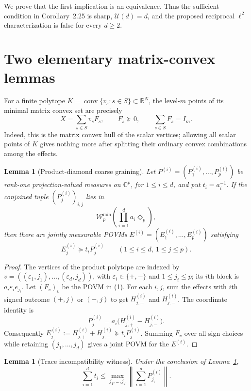 \documentclass[11pt]{article}
\newtheorem{lemma}[theorem]{Lemma}
\newcommand{\W}{\mathcal W}
\newcommand{\C}{\mathbb C}
\newcommand{\conv}{\operatorname{conv}}
\begin{document}
We prove that the first implication is an equivalence.  Thus the sufficient
condition in Corollary~2.25 is sharp, $\mathcal U(d)=d$, and the proposed
reciprocal $\ell^2$ characterization is false for every $d\geq2$.

\section{Two elementary matrix-convex lemmas}

For a finite polytope $K=\conv\{v_s:s\in S\}\subset\mathbb R^N$, the
level-$m$ points of its minimal matrix convex set are precisely
\begin{equation}
 X=\sum_{s\in S}v_sF_s,
 \qquad F_s\succeq0,\qquad \sum_{s\in S}F_s=I_m.
\end{equation}
Indeed, this is the matrix convex hull of the scalar vertices; allowing all
scalar points of $K$ gives nothing more after splitting their ordinary convex
combinations among the effects.

\begin{lemma}[Product-diamond coarse graining]\label{lem:coarse}
Let $P^{(i)}=(P^{(i)}_1,\ldots,P^{(i)}_p)$ be rank-one projection-valued
measures on $\C^p$, for $1\leq i\leq d$, and put $t_i=a_i^{-1}$.  If the
conjoined tuple $(P^{(i)}_j)_{i,j}$ lies in
\[
 \W^{\min}_p\!\left(\prod_{i=1}^d a_i\Diamond_p\right),
\]
then there are jointly measurable POVMs
$E^{(i)}=(E^{(i)}_1,\ldots,E^{(i)}_p)$ satisfying
\begin{equation}
 E^{(i)}_j\succeq t_iP^{(i)}_j\qquad(1\leq i\leq d,\ 1\leq j\leq p).
\end{equation}
\end{lemma}

\begin{proof}
The vertices of the product polytope are indexed by
$v=((\varepsilon_1,j_1),\ldots,(\varepsilon_d,j_d))$, with
$\varepsilon_i\in\{+,-\}$ and $1\leq j_i\leq p$; its $i$th block is
$a_i\varepsilon_i e_{j_i}$.  Let $(F_v)_v$ be the POVM in (1).  For each
$i,j$, sum the effects with $i$th signed outcome $(+,j)$ or $(-,j)$ to get
$H^{(i)}_{j,+}$ and $H^{(i)}_{j,-}$.  The coordinate identity is
\[
 P^{(i)}_j=a_i\bigl(H^{(i)}_{j,+}-H^{(i)}_{j,-}\bigr).
\]
Consequently
$E^{(i)}_j:=H^{(i)}_{j,+}+H^{(i)}_{j,-}\succeq t_iP^{(i)}_j$.
Summing $F_v$ over all sign choices while retaining
$(j_1,\ldots,j_d)$ gives a joint POVM for the $E^{(i)}$.
\end{proof}

\begin{lemma}[Trace incompatibility witness]\label{lem:witness}
Under the conclusion of Lemma~\ref{lem:coarse},
\begin{equation}
 \sum_{i=1}^d t_i
 \leq \max_{j_1,\ldots,j_d}
 \left\|\sum_{i=1}^dP^{(i)}_{j_i}\right\|.
\end{equation}
\end{lemma}
\end{document}
